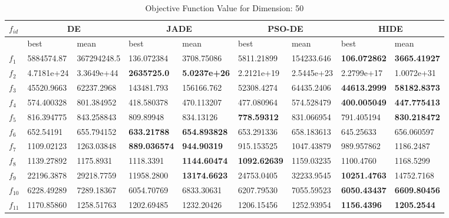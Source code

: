 \begingroup
\renewcommand\arraystretch{0.7}
\begin{table*}[h!]
\centering
\caption{Objective Function Value for Dimension: 50}
 \begin{tabular}{|p{0.8cm}|p{1.6cm}|p{1.6cm}|p{1.6cm}|p{1.6cm}|p{1.6cm}|p{1.6cm}|p{1.6cm}|p{1.6cm}|} 
 \hline
$f_{id}$ & \multicolumn{2}{c|}{DE} & \multicolumn{2}{c|}{JADE} & \multicolumn{2}{c|}{PSO-DE} & \multicolumn{2}{c|}{HIDE} \\
 \hline
    & best & mean & best & mean & best & mean & best & mean \\ [0.5ex] 
 \hline
$f_{1}$  & 5884574.87 & 367294248.5 & 136.072384 & 3708.75086 & 5811.21899 & 154233.646 & \textbf{106.072862} & \textbf{3665.41927} \\ 
$f_{2}$  & 4.7181e+24 & 3.3649e+44 & \textbf{2635725.0} & \textbf{5.0237e+26} & 2.2121e+19 & 2.5445e+23 & 2.2799e+17 & 1.0072e+31 \\ 
$f_{3}$  & 45520.9663 & 62237.2968 & 143481.793 & 156166.762 & 52308.4274 & 64435.2406 & \textbf{44613.2999} & \textbf{58182.8373} \\
$f_{4}$  & 574.400328 & 801.384952 & 418.580378 & 470.113207 & 477.080964 & 574.528479 & \textbf{400.005049} & \textbf{447.775413} \\ 
$f_{5}$  & 816.394775 & 843.258843 & 809.89948 & 834.13126 & \textbf{778.59312} & 831.066954 & 791.405194 & \textbf{830.218472} \\ 
$f_{6}$  & 652.54191 & 655.794152 & \textbf{633.21788} & \textbf{654.893828} & 653.291336 & 658.183613 & 645.25633 & 656.060597 \\ 
$f_{7}$  & 1109.02123 & 1263.03848 & \textbf{889.036574} & \textbf{944.90319} & 915.153525 & 1047.43879 & 989.957862 & 1186.2487 \\ 
$f_{8}$  & 1139.27892 & 1175.8931 & 1118.3391 & \textbf{1144.60474} & \textbf{1092.62639} & 1159.03235 & 1100.4760 & 1168.5299 \\ 
$f_{9}$  & 22196.3878 & 29218.7759 & 11958.2800 & \textbf{13174.6623} & 24753.0405 & 32233.9545 & \textbf{10251.4763} & 14752.7168 \\ 
$f_{10}$  & 6228.49289 & 7289.18367 & 6054.70769 & 6833.30631 & 6207.79530 & 7055.59523 & \textbf{6050.43437} & \textbf{6609.80456} \\ 
$f_{11}$  & 1170.85860 & 1258.51763 & 1202.69485 & 1232.20426 & 1206.15456 & 1252.93954 & \textbf{1156.4396} & \textbf{1205.2544} \\ 

\end{tabular}
\end{table*}
